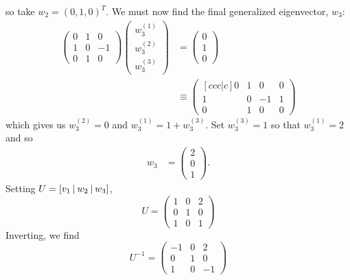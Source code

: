 \documentclass{article}
\begin{document}
\begin{itemize}
    so take $w_2 = (0,1,0)^T$. We must now find the final generalized eigenvector, $w_3$:
    \begin{align*}
        \begin{pmatrix}
            0 & 1 & 0\\
            1 & 0 & -1\\
            0 & 1 & 0
        \end{pmatrix}\begin{pmatrix}
            w_3^{(1)}\\
            w_3^{(2)}\\
            w_3^{(3)}
        \end{pmatrix} &= \begin{pmatrix}
            0 \\
            1\\
            0
        \end{pmatrix}\\
        &\equiv \begin{pmatrix}[ccc|c]
            0 & 1 & 0 & 0\\
            1 & 0 & -1 & 1\\
            0 & 1 & 0 & 0
        \end{pmatrix}
    \end{align*}
    which gives us $w_3^{(2)} = 0$ and $w_3^{(1)} = 1 + w_3^{(3)}$. Set $w_3^{(3)} = 1$ so that $w_3^{(1)} = 2$ and so
    \begin{align*}
        w_3 &= \begin{pmatrix}
            2\\
            0\\
            1
        \end{pmatrix}.
    \end{align*}
    Setting $U = [v_1 \hspace{0.2em} | \hspace{0.2em} w_2 \hspace{0.2em} | \hspace{0.2em} w_3]$, 
    \[U = \begin{pmatrix}
        1 & 0 & 2\\
        0 & 1 & 0\\
        1 & 0 & 1
    \end{pmatrix}\]
    Inverting, we find
    \[U^{-1} = \begin{pmatrix}
        -1 & 0 & 2\\
        0 & 1 & 0\\
        1 & 0 & -1
    \end{pmatrix}\]

\end{itemize}
\end{document}
